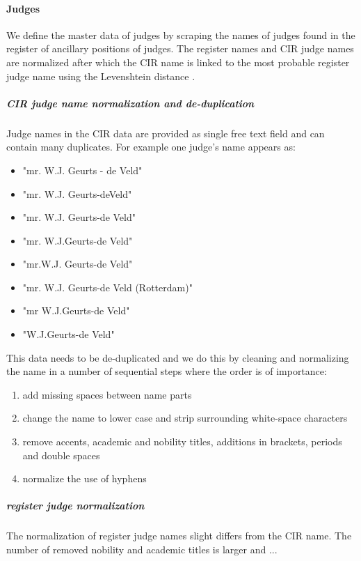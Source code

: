\paragraph{Judges}
We define the master data of judges by scraping the names of judges found in the register of ancillary positions of judges\cite{rechtspraak:nevenfuncties}. The register names and CIR judge names are normalized after which the CIR name is linked to the most probable register judge name using the Levenshtein distance .

\subparagraph{CIR judge name normalization and de-duplication}
Judge names in the CIR data are provided as single free text field and can contain many duplicates. For example one judge's name appears as:

\begin{itemize}
\item "mr. W.J. Geurts - de Veld"
\item "mr. W.J. Geurts-deVeld"
\item "mr. W.J. Geurts-de Veld"
\item "mr. W.J.Geurts-de Veld"
\item "mr.W.J. Geurts-de Veld"
\item "mr. W.J. Geurts-de Veld (Rotterdam)"
\item "mr W.J.Geurts-de Veld"
\item "W.J.Geurts-de Veld"
\end{itemize}

This data needs to be de-duplicated and we do this by cleaning and normalizing the name in a number of sequential steps where the order is of importance:
\begin{enumerate}
\item add missing spaces between name parts
\item change the name to lower case and strip surrounding white-space characters
\item remove accents, academic and nobility titles, additions in brackets, periods and double spaces
\item normalize the use of hyphens
\end{enumerate}

\subparagraph{register judge normalization}
The normalization of register judge names slight differs from the CIR name. The number of removed nobility and academic titles is larger and ...



